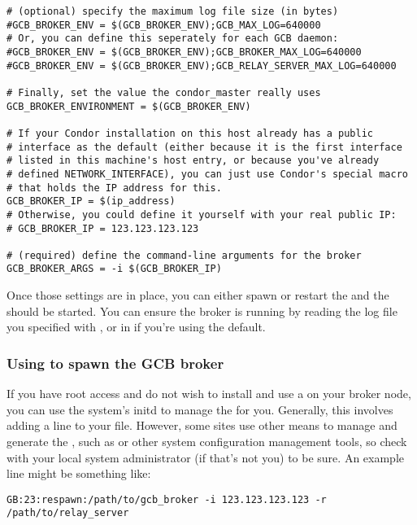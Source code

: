 \begin{verbatim}
# (optional) specify the maximum log file size (in bytes)
#GCB_BROKER_ENV = $(GCB_BROKER_ENV);GCB_MAX_LOG=640000
# Or, you can define this seperately for each GCB daemon:
#GCB_BROKER_ENV = $(GCB_BROKER_ENV);GCB_BROKER_MAX_LOG=640000
#GCB_BROKER_ENV = $(GCB_BROKER_ENV);GCB_RELAY_SERVER_MAX_LOG=640000

# Finally, set the value the condor_master really uses
GCB_BROKER_ENVIRONMENT = $(GCB_BROKER_ENV)

# If your Condor installation on this host already has a public
# interface as the default (either because it is the first interface
# listed in this machine's host entry, or because you've already
# defined NETWORK_INTERFACE), you can just use Condor's special macro
# that holds the IP address for this.
GCB_BROKER_IP = $(ip_address)
# Otherwise, you could define it yourself with your real public IP:
# GCB_BROKER_IP = 123.123.123.123

# (required) define the command-line arguments for the broker 
GCB_BROKER_ARGS = -i $(GCB_BROKER_IP)
\end{verbatim}
\normalsize

Once those settings are in place, you can either spawn or restart the
 and the  should be started.
You can ensure the broker is running by reading the log file you
specified with , or in
 if you're using the default.


\subsubsection{\label{sec:GCB-initd-spawn}
Using  to spawn the GCB broker}

If you have root access and do not wish to install and use a
 on your broker node, you can use the system's initd to
manage the  for you.
Generally, this involves adding a line to your 
file.
However, some sites use other means to manage and generate the
, such as  or other system configuration
management tools, so check with your local system administrator (if
that's not you) to be sure.
An example line might be something like:

\footnotesize
\begin{verbatim}
GB:23:respawn:/path/to/gcb_broker -i 123.123.123.123 -r /path/to/relay_server
\end{verbatim}
\normalsize

